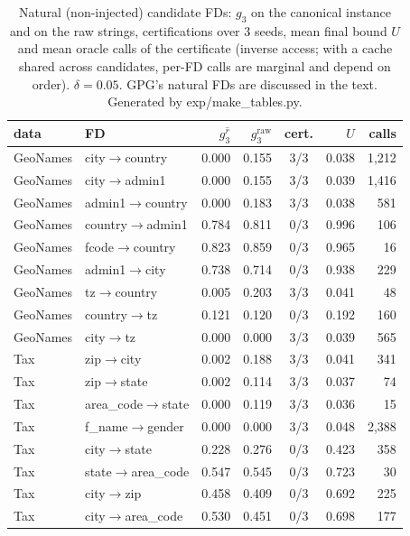 \begin{table}[t]\centering\footnotesize\caption{Natural (non-injected) candidate FDs: $g_3$ on the canonical instance and on the raw strings, certifications over 3 seeds, mean final bound $U$ and mean oracle calls of the certificate (inverse access; with a cache shared across candidates, per-FD calls are marginal and depend on order). $\delta=0.05$. GPG's natural FDs are discussed in the text. Generated by exp/make\_tables.py.}\label{tab:natural}
\setlength{\tabcolsep}{2.5pt}\begin{tabular}{llrrcrr}\toprule
data & FD & $g_3^{\hat r}$ & $g_3^{\mathrm{raw}}$ & cert. & $U$ & calls \\\midrule
GeoNames & city$\rightarrow$country & 0.000 & 0.155 & 3/3 & 0.038 & 1,212 \\
GeoNames & city$\rightarrow$admin1 & 0.000 & 0.155 & 3/3 & 0.039 & 1,416 \\
GeoNames & admin1$\rightarrow$country & 0.000 & 0.183 & 3/3 & 0.038 & 581 \\
GeoNames & country$\rightarrow$admin1 & 0.784 & 0.811 & 0/3 & 0.996 & 106 \\
GeoNames & fcode$\rightarrow$country & 0.823 & 0.859 & 0/3 & 0.965 & 16 \\
GeoNames & admin1$\rightarrow$city & 0.738 & 0.714 & 0/3 & 0.938 & 229 \\
GeoNames & tz$\rightarrow$country & 0.005 & 0.203 & 3/3 & 0.041 & 48 \\
GeoNames & country$\rightarrow$tz & 0.121 & 0.120 & 0/3 & 0.192 & 160 \\
GeoNames & city$\rightarrow$tz & 0.000 & 0.000 & 3/3 & 0.039 & 565 \\
Tax & zip$\rightarrow$city & 0.002 & 0.188 & 3/3 & 0.041 & 341 \\
Tax & zip$\rightarrow$state & 0.002 & 0.114 & 3/3 & 0.037 & 74 \\
Tax & area\_code$\rightarrow$state & 0.000 & 0.119 & 3/3 & 0.036 & 15 \\
Tax & f\_name$\rightarrow$gender & 0.000 & 0.000 & 3/3 & 0.048 & 2,388 \\
Tax & city$\rightarrow$state & 0.228 & 0.276 & 0/3 & 0.423 & 358 \\
Tax & state$\rightarrow$area\_code & 0.547 & 0.545 & 0/3 & 0.723 & 30 \\
Tax & city$\rightarrow$zip & 0.458 & 0.409 & 0/3 & 0.692 & 225 \\
Tax & city$\rightarrow$area\_code & 0.530 & 0.451 & 0/3 & 0.698 & 177 \\

\end{tabular}
\end{table}
